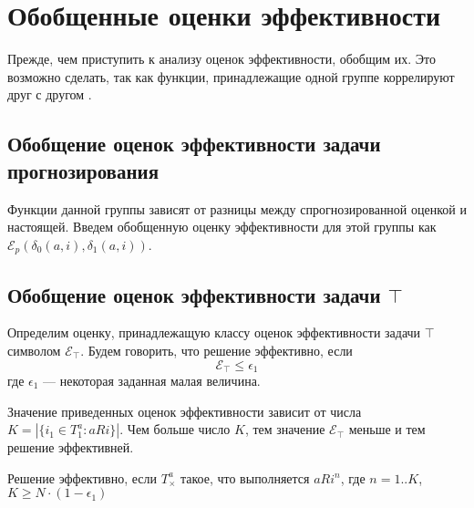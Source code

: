 \section{Обобщенные оценки эффективности}
Прежде, чем приступить к анализу оценок эффективности, обобщим их. Это возможно сделать, так
как функции, принадлежащие одной группе коррелируют друг с другом \cite{herloker-eval}.

\subsection{Обобщение оценок эффективности задачи прогнозирования}
Функции данной группы зависят от разницы между спрогнозированной оценкой и настоящей.
Введем обобщенную оценку эффективности для этой группы как $\mathcal{E}_p(\delta_0(a, i), \delta_1(a, i))$.

\subsection{Обобщение оценок эффективности задачи $\top$}
Определим оценку, принадлежащую классу оценок эффективности задачи $\top$ символом $\mathcal{E}_{\top}$.
Будем говорить, что решение эффективно, если
\begin{equation}
\mathcal{E}_{\top} \le \epsilon_1
\end{equation}
где $\epsilon_1$ --- некоторая заданная малая величина.

Значение приведенных оценок эффективности зависит от числа $K = |\{ i_1 \in T^a_1: a \mathit{R} i \}|$. 
Чем больше число $K$, тем значение $\mathcal{E}_{\top}$ меньше и тем решение эффективней.

\begin{assert}
Решение эффективно, если $T^a_{\times}$ такое, что выполняется $a \mathit{R} i^n$, где $n=1..K$, $K \ge N \cdot (1 - \epsilon_1)$
\end{assert}

